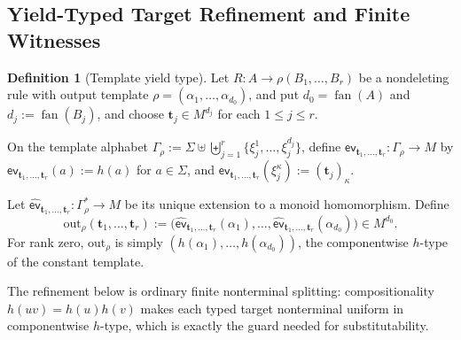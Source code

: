 \documentclass[11pt]{article}
\numberwithin{equation}{section}
\theoremstyle{plain}
\theoremstyle{definition}
\newtheorem{definition}[theorem]{Definition}
\theoremstyle{remark}
\newcommand{\out}{\mathrm{out}}
\newcommand{\fan}{\operatorname{fan}}
\newcommand{\evalmap}{\mathsf{ev}}
\begin{document}
\subsection{Yield-Typed Target Refinement and Finite Witnesses}
\label{sec:refinement}

\begin{definition}[Template yield type]
\label{def:output-map}
Let
\(R:A\to\rho(B_1,\ldots,B_r)\)
be a nondeleting rule with output template
\(\rho=(\alpha_1,\ldots,\alpha_{d_0})\), and put \(d_0=\fan(A)\) and
\(d_j:=\fan(B_j)\), and choose
\(\mathbf t_j\in M^{d_j}\) for each \(1\le j\le r\).

On the template alphabet
\(
  \Gamma_\rho
  :=\Sigma\uplus\biguplus_{j=1}^r
  \{\xi_j^1,\ldots,\xi_j^{d_j}\}
\),
define
\(\evalmap_{\mathbf t_1,\ldots,\mathbf t_r}\colon\Gamma_\rho\to M\)
by
\(\evalmap_{\mathbf t_1,\ldots,\mathbf t_r}(a):=h(a)\)
for \(a\in\Sigma\), and
\(\evalmap_{\mathbf t_1,\ldots,\mathbf t_r}(\xi_j^{\kappa}):=(\mathbf t_j)_\kappa\).

Let
\(
  \widehat{\evalmap}_{\mathbf t_1,\ldots,\mathbf t_r}
  \colon\Gamma_\rho^*\to M
\)
be its unique extension to a monoid homomorphism.
Define
\[
  \out_\rho(\mathbf t_1,\ldots,\mathbf t_r)
  :=
  \bigl(
    \widehat{\evalmap}_{\mathbf t_1,\ldots,\mathbf t_r}(\alpha_1),
    \ldots,
    \widehat{\evalmap}_{\mathbf t_1,\ldots,\mathbf t_r}(\alpha_{d_0})
  \bigr)
\in M^{d_0}.
\]
For rank zero, \(\out_\rho\) is simply
\((h(\alpha_1),\ldots,h(\alpha_{d_0}))\), the componentwise \(h\)-type of the
constant template.
\end{definition}

The refinement below is ordinary finite nonterminal splitting: compositionality
$h(uv)=h(u)h(v)$ makes each typed target nonterminal uniform in componentwise
$h$-type, which is exactly the guard needed for substitutability.
\end{document}

